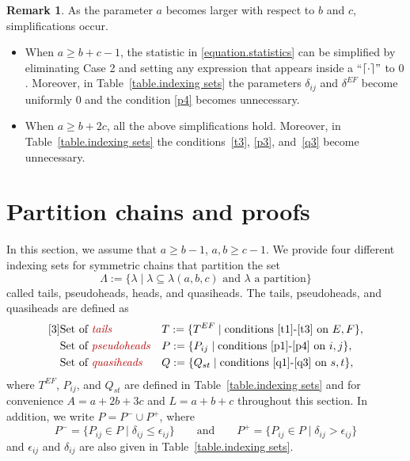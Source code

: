\documentclass[11pt,reqno]{amsart}
\newcommand{\defn}[1]{{\color{darkred}\emph{#1}}} %
\theoremstyle{definition}
\newtheorem{remark}[theorem]{Remark}
\numberwithin{equation}{section}
\begin{document}
\begin{remark}
As the parameter $a$ becomes larger with respect to $b$ and $c$, simplifications occur.  
\begin{itemize}
\item When $a\geqslant b+c-1$, the statistic in \eqref{equation.statistics} can be simplified by eliminating 
Case 2 and setting any expression that appears inside a ``$\lceil \cdot \rceil"$ to $0$. Moreover, in 
Table~\ref{table.indexing sets} the parameters $\delta_{ij}$ and $\delta^{EF}$ become uniformly $0$ and the 
condition \eqref{p4} becomes unnecessary.  
\item When $a \geqslant b+2c$, all the above simplifications hold.  Moreover, in Table~\ref{table.indexing sets}
the conditions~\eqref{t3}, \eqref{p3}, and~\eqref{q3} become unnecessary.
\end{itemize}

\end{remark}
\section{Partition chains and proofs}
\label{section.proof}

In this section, we assume that $a \geqslant b-1$, $a,b \geqslant c-1$. 
We provide four different indexing sets for symmetric chains that partition the set 
\[
	\Lambda := \{ \lambda \mid \text{$\lambda \subseteq \lambda(a,b,c)$ and $\lambda$ a partition}\}
\]
called tails, pseudoheads, heads, and quasiheads. The tails, pseudoheads, and quasiheads are defined as
\begin{equation}
\begin{aligned}[3]
	&\text{Set of \defn{tails}}  &&T := \{T^{EF} \mid \text{conditions \eqref{t1}-\eqref{t3} on $E,F$} \},\\
	&\text{Set of \defn{pseudoheads}}  &&P := \{ P_{ij} \mid \text{conditions \eqref{p1}-\eqref{p4} on $i,j$} \},\\
	&\text{Set of \defn{quasiheads}}  &&Q := \{ Q_{st} \mid \text{conditions \eqref{q1}-\eqref{q3} on $s,t$} \},
\end{aligned}
\end{equation}
where $T^{EF}$, $P_{ij}$, and $Q_{st}$ are defined in Table~\ref{table.indexing sets} and 
for convenience $A=a+2b+3c$ and $L=a+b+c$ throughout this section.
In addition, we write $P=P^- \cup P^+$, where
\[
	P^- = \{ P_{ij} \in P \mid \delta_{ij} \leqslant \epsilon_{ij}\} \qquad \text{and} \qquad
	P^+ =  \{ P_{ij} \in P \mid \delta_{ij} > \epsilon_{ij}\}
\]
and $\epsilon_{ij}$ and $\delta_{ij}$ are also given in Table~\ref{table.indexing sets}.
\end{document}
